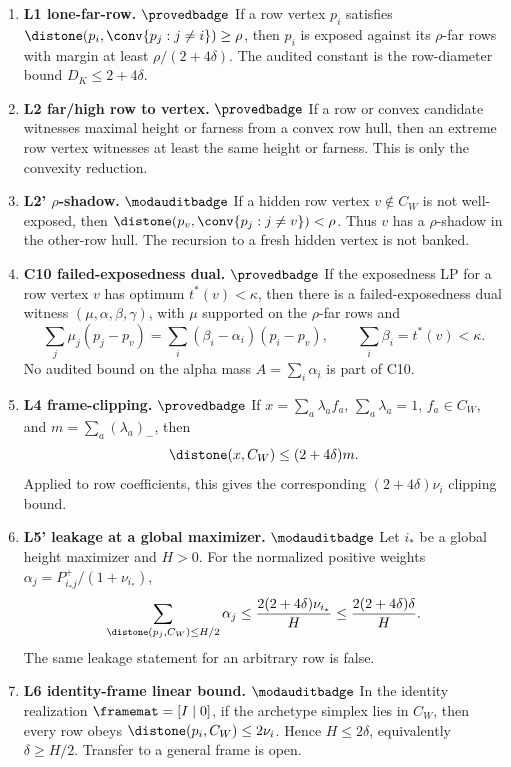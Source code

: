 \begin{enumerate}[leftmargin=*,itemsep=0.5ex]
\item \textbf{L1 lone-far-row.} \(\provedbadge\)
If a row vertex \(p_i\) satisfies
\(\distone(p_i,\conv\{p_j:j\ne i\})\ge\rho\), then \(p_i\) is exposed
against its \(\rho\)-far rows with margin at least
\(\rho/(2+4\delta)\).  The audited constant is the row-diameter bound
\(D_K\le 2+4\delta\).

\item \textbf{L2 far/high row to vertex.} \(\provedbadge\)
If a row or convex candidate witnesses maximal height or farness from a
convex row hull, then an extreme row vertex witnesses at least the same
height or farness.  This is only the convexity reduction.

\item \textbf{L2' \(\rho\)-shadow.} \(\modauditbadge\)
If a hidden row vertex \(v\notin C_W\) is not well-exposed, then
\(\distone(p_v,\conv\{p_j:j\ne v\})<\rho\).  Thus \(v\) has a
\(\rho\)-shadow in the other-row hull.  The recursion to a fresh hidden
vertex is not banked.

\item \textbf{C10 failed-exposedness dual.} \(\provedbadge\)
If the exposedness LP for a row vertex \(v\) has optimum
\(t^*(v)<\kappa\), then there is a failed-exposedness dual witness
\((\mu,\alpha,\beta,\gamma)\), with \(\mu\) supported on the
\(\rho\)-far rows and
\[
 \sum_j\mu_j(p_j-p_v)=\sum_i(\beta_i-\alpha_i)(p_i-p_v),
        \qquad \sum_i\beta_i=t^*(v)<\kappa .
\]
No audited bound on the alpha mass \(A=\sum_i\alpha_i\) is part of C10.

\item \textbf{L4 frame-clipping.} \(\provedbadge\)
If \(x=\sum_a\lambda_a f_a\), \(\sum_a\lambda_a=1\),
\(f_a\in C_W\), and \(m=\sum_a(\lambda_a)_-\), then
\[
        \distone(x,C_W)\le (2+4\delta)m .
\]
Applied to row coefficients, this gives the corresponding
\((2+4\delta)\nu_i\) clipping bound.

\item \textbf{L5' leakage at a global maximizer.} \(\modauditbadge\)
Let \(i_*\) be a global height maximizer and \(H>0\).  For the normalized
positive weights \(\alpha_j=P_{i_*j}^+/(1+\nu_{i_*})\),
\[
 \sum_{\distone(p_j,C_W)\le H/2}\alpha_j
       \le \frac{2(2+4\delta)\nu_{i_*}}{H}
       \le \frac{2(2+4\delta)\delta}{H}.
\]
The same leakage statement for an arbitrary row is false.

\item \textbf{L6 identity-frame linear bound.} \(\modauditbadge\)
In the identity realization \(\framemat=[I\mid 0]\), if the archetype
simplex lies in \(C_W\), then every row obeys
\(\distone(p_i,C_W)\le 2\nu_i\).  Hence \(H\le 2\delta\), equivalently
\(\delta\ge H/2\).  Transfer to a general frame is open.


\end{enumerate}
